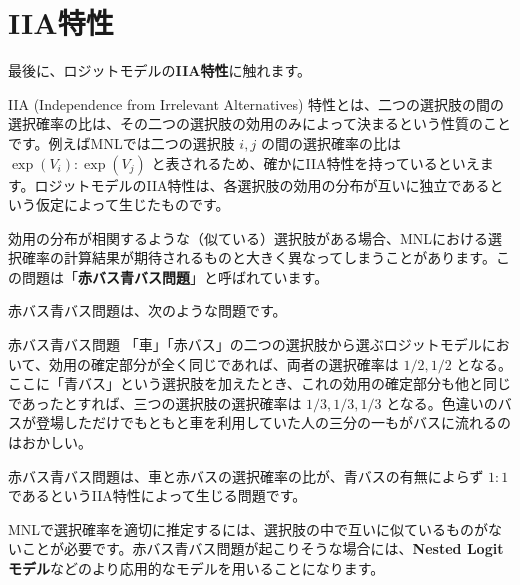 \section{IIA特性}\label{sec:iia}

最後に、ロジットモデルの\textbf{IIA特性}に触れます。

IIA (Independence from Irrelevant Alternatives) 特性とは、二つの選択肢の間の選択確率の比は、その二つの選択肢の効用のみによって決まるという性質のことです。例えばMNLでは二つの選択肢 $i, j$ の間の選択確率の比は $\exp(V_i):\exp(V_j)$ と表されるため、確かにIIA特性を持っているといえます。ロジットモデルのIIA特性は、各選択肢の効用の分布が互いに独立であるという仮定によって生じたものです。

効用の分布が相関するような（似ている）選択肢がある場合、MNLにおける選択確率の計算結果が期待されるものと大きく異なってしまうことがあります。この問題は「\textbf{赤バス青バス問題}」と呼ばれています。

赤バス青バス問題は、次のような問題です。

\begin{itembox}[l]{赤バス青バス問題}
    「車」「赤バス」の二つの選択肢から選ぶロジットモデルにおいて、効用の確定部分が全く同じであれば、両者の選択確率は $1/2, 1/2$ となる。ここに「青バス」という選択肢を加えたとき、これの効用の確定部分も他と同じであったとすれば、三つの選択肢の選択確率は $1/3, 1/3, 1/3$ となる。色違いのバスが登場しただけでもともと車を利用していた人の三分の一もがバスに流れるのはおかしい。
\end{itembox}

赤バス青バス問題は、車と赤バスの選択確率の比が、青バスの有無によらず $1:1$ であるというIIA特性によって生じる問題です。

MNLで選択確率を適切に推定するには、選択肢の中で互いに似ているものがないことが必要です。赤バス青バス問題が起こりそうな場合には、\textbf{Nested Logit モデル}などのより応用的なモデルを用いることになります。
